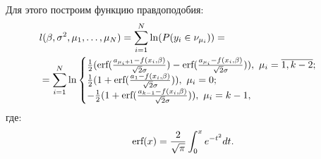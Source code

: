 Для этого построим функцию правдоподобия:
\begin{eqnarray}
    \label{eq22}\label{eq23}&l(\beta,\sigma^2, \mu_1,\dots, \mu_{N})=\sum\limits_{i=1}^{N}\ln(P(y_i\in \nu_{\mu_i}))=\\
    &=\sum\limits_{i=1}^{N}\ln\begin{cases}
        \frac{1}{2}(\textup{erf}(\frac{a_{\mu_i+1}-f(x_i,\beta)}{\sqrt{2}\sigma})-\textup{erf}(\frac{a_{\mu_i}-f(x_i,\beta)}{\sqrt{2}\sigma})),~\mu_i=\overline{1,k-2};\\
        \frac{1}{2}(1+\textup{erf}(\frac{a_{1}-f(x_i,\beta)}{\sqrt{2}\sigma})),~\mu_i=0;\\
        -\frac{1}{2}(1+\textup{erf}(\frac{a_{k-1}-f(x_i,\beta)}{\sqrt{2}\sigma})),~\mu_i=k-1,
    \end{cases}
\end{eqnarray}
где:
\begin{eqnarray}
    \textup{erf}(x)=\frac{2}{\sqrt{\pi}}\int_0^{x}e^{-t^2}dt.
\end{eqnarray}

